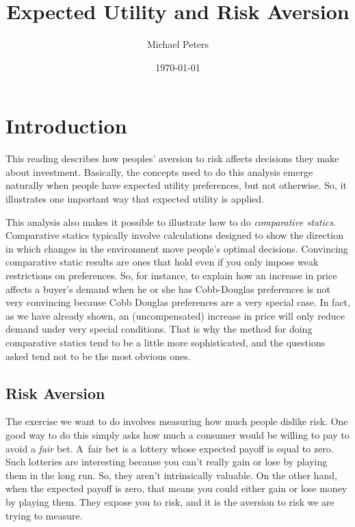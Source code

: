 \documentclass[12pt]{article}
\begin{document}
\title{Expected Utility and Risk Aversion}
\author{Michael Peters}
\date{\today}
\maketitle

\section{Introduction}

This reading describes how peoples' aversion to risk affects decisions they
make about investment. Basically, the concepts used to do this analysis emerge
naturally when people have expected utility preferences, but not otherwise. So,
it illustrates one important way that expected utility is applied.

This analysis also makes it possible to illustrate how to do \emph{comparative
statics}. Comparative statics typically involve calculations designed to show
the direction in which changes in the environment move people's optimal
decisions. Convincing comparative static results are ones that hold even if
you only impose weak restrictions on preferences. So, for instance, to explain
how an increase in price affects a buyer's demand when he or she has
Cobb-Douglas preferences is not very convincing because Cobb Douglas
preferences are a very special case. In fact, as we have already shown, an
(uncompensated) increase in price will only reduce demand under very special
conditions. That is why the method for doing comparative statics tend to be a
little more sophisticated, and the questions asked tend not to be the most
obvious ones.

\subsection{Risk Aversion}

The exercise we want to do involves measuring how much people dislike risk.
One good way to do this simply asks how much a consumer would be willing to
pay to avoid a \emph{fair} bet. A\ fair bet is a lottery whose expected payoff
is equal to zero. Such lotteries are interesting because you can't really gain
or lose by playing them in the long run. So, they aren't intrinsically
valuable. On the other hand, when the expected payoff is zero, that means you
could either gain or lose money by playing them. They expose you to risk, and
it is the aversion to risk we are trying to measure.
\end{document}
